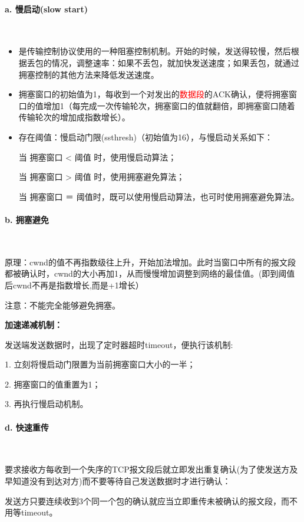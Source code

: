\documentclass[UTF8]{article}%
\begin{document}
\paragraph{a. 慢启动(slow start)}~{}

\begin{itemize}
    \item 是传输控制协议使用的一种阻塞控制机制。开始的时候，发送得较慢，然后根据丢包的情况，调整速率：如果不丢包，就加快发送速度；如果丢包，就通过拥塞控制的其他方法来降低发送速度。
    \item 拥塞窗口的初始值为1，每收到一个对发出的\textcolor{red}{数据段}的ACK确认，便将拥塞窗口的值增加1（每完成一次传输轮次，拥塞窗口的值就翻倍，即拥塞窗口随着传输轮次的增加成指数增长）。
    \item 存在阈值：慢启动门限(ssthresh)（初始值为16），与慢启动关系如下：
    
    当 拥塞窗口 < 阈值 时，使用慢启动算法；

    当 拥塞窗口 > 阈值 时，使用拥塞避免算法；

    当 拥塞窗口 ＝ 阈值时，既可以使用慢启动算法，也可时使用拥塞避免算法。
\end{itemize}

\paragraph{b. 拥塞避免}~{}

原理：cwnd的值不再指数级往上升，开始加法增加。此时当窗口中所有的报文段都被确认时，cwnd的大小再加1，从而慢慢增加调整到网络的最佳值。(即到阈值后cwnd不再是指数增长,而是+1增长）

注意：不能完全能够避免拥塞。

\textbf{加速递减机制：}

发送端发送数据时，出现了定时器超时timeout，便执行该机制:

1. 立刻将慢启动门限置为当前拥塞窗口大小的一半；

2. 拥塞窗口的值重置为1；

3. 再执行慢启动机制。

\paragraph{d. 快速重传}~{}

要求接收方每收到一个失序的TCP报文段后就立即发出重复确认(为了使发送方及早知道没有到达对方)而不要等待自己发送数据时才进行确认：

发送方只要连续收到3个同一个包的确认就应当立即重传未被确认的报文段，而不用等timeout。
\end{document}
